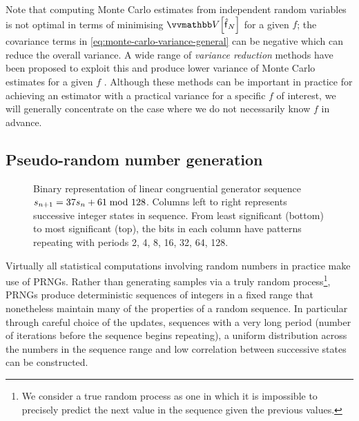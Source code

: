Note that computing Monte Carlo estimates from independent random variables is not optimal in terms of minimising $\var{\hatf_N}$ for a given $f$; the covariance terms in \eqref{eq:monte-carlo-variance-general} can be negative which can reduce the overall variance. A wide range of \emph{variance reduction} methods have been proposed to exploit this and produce lower variance of Monte Carlo estimates for a given $f$ \citep{kroese2011variance}. Although these methods can be important in practice for achieving an estimator with a practical variance for a specific $f$ of interest, we will generally concentrate on the case where we do not necessarily know $f$ in advance. %

\subsection{Pseudo-random number generation}

\begin{figure}
\centering
{}
\caption[Example linear congruential generator sequence.]{Binary representation of linear congruential generator sequence $s_{n+1} = 37s_n + 61 \kern-4pt\mod 128$. Columns left to right represents successive integer states in sequence. From least significant (bottom) to most significant (top), the bits in each column have patterns repeating with periods 2, 4, 8, 16, 32, 64, 128.}
\label{fig:example-lcg-sequence}
\end{figure}

Virtually all statistical computations involving random numbers in practice make use of \acp{PRNG}. Rather than generating samples via a truly random process\footnote{We consider a true random process as one in which it is impossible to precisely predict the next value in the sequence given the previous values.}, \acp{PRNG} produce deterministic sequences of integers in a fixed range that nonetheless maintain many of the properties of a random sequence. In particular through careful choice of the updates, sequences with a very long period (number of iterations before the sequence begins repeating), a uniform distribution across the numbers in the sequence range and low correlation between successive states can be constructed. 

